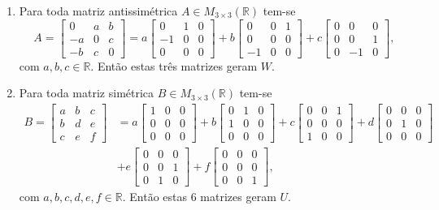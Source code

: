 \documentclass[12pt,a4paper]{article}
\newcommand*\R{\mathbb{R}}
\begin{document}
\begin{enumerate}
\begin{enumerate}
\item Para toda matriz antissimétrica $A \in M_{3 \times 3}(\R)$ tem-se
\[
A
= \begin{bmatrix}
 0 & a & b \\
-a & 0 & c \\
-b & c & 0
\end{bmatrix}
=
a
\begin{bmatrix}
 0 & 1 & 0 \\
-1 & 0 & 0 \\
 0 & 0 & 0
\end{bmatrix}
+b
\begin{bmatrix}
 0 & 0 & 1 \\
 0 & 0 & 0 \\
-1 & 0 & 0
\end{bmatrix}
+c
\begin{bmatrix}
0 &  0 & 0 \\
0 &  0 & 1 \\
0 & -1 & 0
\end{bmatrix},
\]
com $a,b,c \in \R$. Então estas três matrizes geram $W$.

\item Para toda matriz simétrica $B \in M_{3 \times 3}(\R)$ tem-se
\begin{align*}
B
= \begin{bmatrix}
a & b & c \\
b & d & e \\
c & e & f
\end{bmatrix}
&=
a
\begin{bmatrix}
1 & 0 & 0 \\
0 & 0 & 0 \\
0 & 0 & 0
\end{bmatrix}
+b
\begin{bmatrix}
0 & 1 & 0 \\
1 & 0 & 0 \\
0 & 0 & 0
\end{bmatrix}
+c
\begin{bmatrix}
0 & 0 & 1 \\
0 & 0 & 0 \\
1 & 0 & 0
\end{bmatrix}
+d
\begin{bmatrix}
0 & 0 & 0 \\
0 & 1 & 0 \\
0 & 0 & 0
\end{bmatrix}\\
&+e
\begin{bmatrix}
0 & 0 & 0 \\
0 & 0 & 1 \\
0 & 1 & 0
\end{bmatrix}
+f
\begin{bmatrix}
0 & 0 & 0 \\
0 & 0 & 0 \\
0 & 0 & 1
\end{bmatrix},
\end{align*}
com $a,b,c,d,e,f \in \R$. Então estas 6 matrizes geram $U$.
\end{enumerate}


\end{enumerate}
\end{document}
